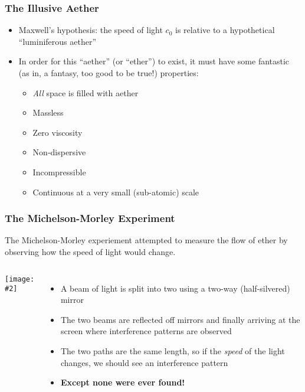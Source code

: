 \documentclass[12pt,compress,aspectratio=169]{beamer}
\newcommand{\pic}[2]{\texttt{[image: \#2]}}
\begin{document}
\begin{frame}
  \frametitle{The Illusive Aether}
  \begin{itemize}
  \item Maxwell's hypothesis: the speed of light $c_0$ is relative to a
    hypothetical ``luminiferous aether''
  \item In order for this ``aether'' (or ``ether'') to exist, it must have some
    fantastic (as in, a fantasy, too good to be true!) properties:
    \begin{itemize}
    \item \emph{All} space is filled with aether
    \item Massless
    \item Zero viscosity
    \item Non-dispersive
    \item Incompressible
    \item Continuous at a very small (sub-atomic) scale
    \end{itemize}
  \end{itemize}
\end{frame}



\begin{frame}
  \frametitle{The Michelson-Morley Experiment}
  The Michelson-Morley experiement attempted to measure the flow of ether by
  observing how the speed of light would change.
  \begin{columns}
    \begin{center}
      \pic{1.1}{graphics/313754.jpg}
    \end{center}

    \begin{itemize}
    \item A beam of light is split into two using a two-way (half-silvered)
      mirror
    \item The two beams are reflected off mirrors and finally arriving at the
      screen where interference patterns are observed
    \item The two paths are the same length, so if the \emph{speed} of the light
      changes, we should see an interference pattern
    \item\textbf{Except none were ever found!}
    \end{itemize}
  \end{columns}
\end{frame}
\end{document}

